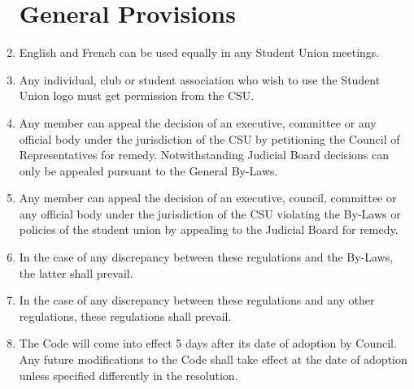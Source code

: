 \documentclass[oneside]{book}
\begin{document}
\begin{enumerate}
\chapter{\label{General_Provisions}General Provisions }
\item English and French can be used equally in any Student Union meetings. 
\item Any individual, club or student association who wish to use the Student
Union logo must get permission from the CSU. 
\item Any member can appeal the decision of an executive, committee or any
official body under the jurisdiction of the CSU by petitioning the
Council of Representatives for remedy. Notwithstanding Judicial Board
decisions can only be appealed pursuant to the General By-Laws. 
\item Any member can appeal the decision of an executive, council, committee
or any official body under the jurisdiction of the CSU violating the
By-Laws or policies of the student union by appealing to the Judicial
Board for remedy. 
\item In the case of any discrepancy between these regulations and the By-Laws,
the latter shall prevail. 
\item In the case of any discrepancy between these regulations and any other
regulations, these regulations shall prevail. 
\item The Code will come into effect 5 days after its date of adoption by
Council. Any future modifications to the Code shall take effect at
the date of adoption unless specified differently in the resolution. \end{enumerate}
\cleardoublepage  
{}  
{} 

\end{document}
